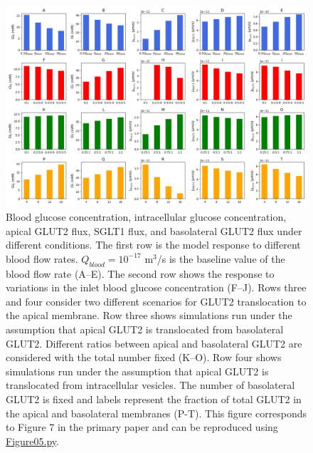 \documentclass[fleqn,10pt]{physiome}
\begin{document}
\begin{figure}[htb]
\centering
\includegraphics[width= 1\linewidth]{Figure05}
\caption{Blood glucose concentration, intracellular glucose concentration, apical GLUT2 flux, SGLT1 flux, and basolateral GLUT2 flux under different conditions. The first row is the model response to different blood flow rates. $Q_{blood}=10^{-17}$ m$^3$/s is the baseline value of the blood flow rate (A–E). The second row shows the response to variations in the inlet blood glucose concentration (F–J). Rows three and four consider two different scenarios for GLUT2 translocation to the apical membrane. Row three shows simulations run under the assumption that apical GLUT2 is translocated from basolateral GLUT2. Different ratios between apical and basolateral GLUT2 are considered with the total number fixed (K–O). Row four shows simulations run under the assumption that apical GLUT2 is translocated from intracellular vesicles. The number of basolateral GLUT2 is fixed and labels represent the fraction of total GLUT2 in the apical and basolateral membranes (P-T). This figure corresponds to Figure 7 in the primary paper and can be reproduced using \href{https://models.physiomeproject.org/workspace/840/rawfile/bc7a5ac43ddbd15d234e66d8cb17df8388d80064/Figure05.py}{Figure05.py}.}
\label{Figure5}
\end{figure}
\end{document}
